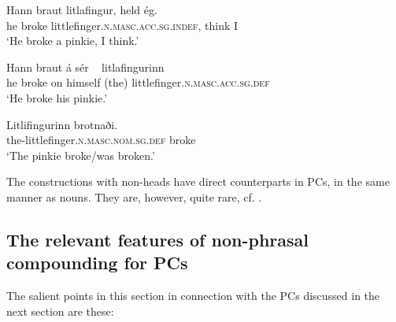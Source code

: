 \documentclass[output=paper]{LSP/langsci}
\begin{document}
\begin{xlist}
\ea%
 \label{ex:bjarnadottir:13} 
\ea
\gll Hann braut litlafingur,  held ég.\\
 he broke littlefinger\textsc{.n.masc.acc.sg.indef}, think I\\
\glt ‘He broke a pinkie, I think.’

\ex
\gll Hann braut á sér ~ litlafingurinn\\
 he broke on himself  (the) littlefinger\textsc{.n.masc.acc.sg.def}\\
\glt ‘He broke his pinkie.’

\ex
\gll Litlifingurinn brotnaði.\\
 the-littlefinger\textsc{.n.masc.nom.sg.def} broke\\
\glt ‘The pinkie broke/was broken.’
\z
\z

The  constructions with  non-heads have direct counterparts in 
PCs, in the same manner as nouns. They are, however, quite rare, cf. .

\subsection{The relevant features of non-phrasal compounding for PCs}

The salient points in this section in connection with the PCs discussed in the next section are these:


\end{xlist}
\end{document}
